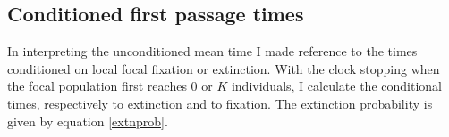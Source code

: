 \subsection*{Conditioned first passage times}
In interpreting the unconditioned mean time I made reference to the times conditioned on local focal fixation or extinction. 
With the clock stopping when the focal population first reaches $0$ or $K$ individuals, I calculate the conditional times, respectively to extinction and to fixation. 
The extinction probability is given by equation \ref{extnprob}. 
